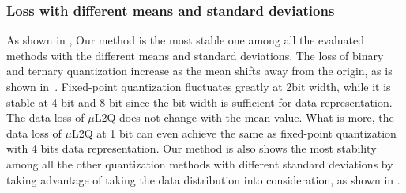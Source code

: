 \subsubsection{Loss with different means and standard deviations}
As shown in , Our method is the most stable one among all the evaluated methods with the different means and standard deviations.
The loss of binary and ternary quantization increase as the mean shifts away from the origin, as is shown in~.
Fixed-point quantization fluctuates greatly at 2bit width, while it is stable at 4-bit and 8-bit since the bit width is sufficient for data representation. 
The data loss of $\mu$L2Q does not change with the mean value. What is more, the data loss of $\mu$L2Q at 1 bit can even achieve the same as fixed-point quantization with 4 bits data representation. 
Our method is also shows the most stability among all the other quantization methods with different standard deviations by taking advantage of taking the data distribution into consideration, as shown in . 


